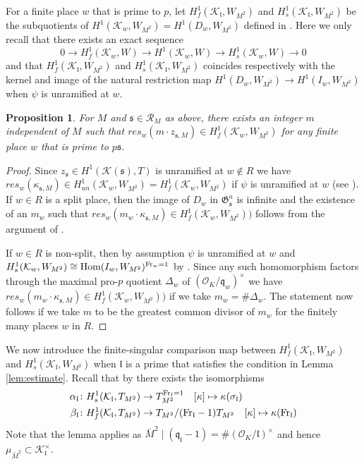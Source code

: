\documentclass[leqno]{amsart}
\newtheorem{prop}[thm]{Proposition}
\theoremstyle{definition}
\theoremstyle{remark}
\newcommand{\oo}{\mathcal{O}}
\DeclareMathOperator{\Hom}{Hom}
\newcommand{\Fr}{\textnormal{Fr}} %
\newcommand{\fl}{\mathfrak{l}}
\newcommand{\fq}{\mathfrak{q}}
\newcommand{\fs}{\mathfrak{s}}
\newcommand{\K}{{\mathcal{K}}} %
\newcommand{\fG}{\mathfrak{G}}
\begin{document}
For a finite place $w$ that is prime to $p$,
let $H^1_f(\K_\fl,W_{M^2})$ and
$H^1_s(\K_\fl,W_{M^2})$ 
be the subquotients of 
$H^1(\K_w,W_{M^2})= H^1(D_w,W_{M^2})$
defined in \cite[Def 1.3.4]{Rubin}.
Here we only recall that there exists an exact sequence
\[
    0\to H^1_f(\K_w,W)\to H^1(\K_w,W)\to H^1_s(\K_w,W)\to 0
\]
and that $H^1_f(\K_\fl,W_{M^2})$ and
$H^1_s(\K_\fl,W_{M^2})$ 
coincides respectively with the kernel and image
of the natural restriction map
$H^1(D_w, W_{M^2})\to H^1(I_w, W_{M^2})$
when $\psi$ is unramified at $w$.



\begin{prop}
For $M$ and $\fs\in \mathcal{R}_M$ as above,
there exists an integer $m$
independent of $M$ such that 
$res_w(m\cdot z_{\fs,M})\in H^1_f(\K_w,W_{M^2})$
for any finite place $w$ that is prime to $p\fs$.
\end{prop}

\begin{proof}

Since $z_\fs\in H^1(\K(\fs),T)$
is unramified at $w\notin R$
we have $res_w(\kappa_{\fs,M})\in
H^1_{un}(\K_w,W_{M^2})=H^1_f(\K_w,W_{M^2})$
if $\psi$ is unramified at $w$
(see \cite[Lem 1.3.8(ii)]{Rubin}).
If $w\in R$ is a split place,
then the image of $D_w$ in $\fG_{\fs}^a$
is infinite and the existence of an $m_w$ such that
$res_w(m_w\cdot \kappa_{\fs,M})\in
H^1_f(\K_w,W_{M^2}))$
follows from the argument of 
\cite[Cor 4.6.5]{Rubin}.

If $w\in R$ is non-split,
then by assumption $\psi$ is unramified at $w$
and $H^1_s(\K_w,W_{M^2})\cong \Hom(I_w, W_{M^2})^{\Fr_w=1}$
by \cite[Lem 1.3.2(ii)]{Rubin}.
Since any such  homomorphism
factors through the maximal pro-$p$
quotient $\Delta_w$ of $(\oo_K/\fq_w)^\times$
we have $res_w(m_w\cdot \kappa_{\fs,M})\in
H^1_f(\K_w,W_{M^2}))$
if we take $m_w=\# \Delta_w$.
The  statement now follows if we take
$m$ to be the greatest common divisor of $m_w$
for the finitely many places $w$ in $R$.

\end{proof}

We now introduce the finite-singular comparison map
between 
$H^1_f(\K_\fl,W_{M^2})$ and
$H^1_s(\K_\fl,W_{M^2})$ 
when $\fl$ is a prime that satisfies the condition
in Lemma \ref{lem:estimate}.
Recall that by \cite[Lem 1.4.7]{Rubin}
there exists the isomorphisms
\begin{align}
\alpha_\fl&\colon
H^1_s(\K_\fl,T_{M^2})\to T_{M^2}^{\Fr_\fl=1}\quad
[\kappa]\mapsto \kappa(\sigma_\fl)
\label{eq:singular} \\
\beta_\fl&\colon 
H^1_f(\K_\fl,T_{M^2})\to T_{M^2}/(\Fr_\fl-1)T_{M^2}\quad
[\kappa]\mapsto \kappa(\Fr_\fl)
\label{eq:finite}
\end{align}
Note that the lemma applies 
as $\bar{M}^2\mid (\fq_\fl-1)=\#(\oo_K/\fl)^\times$
and hence $\mu_{\bar{M}^2}\subset \K_\fl^\times$.
\end{document}

